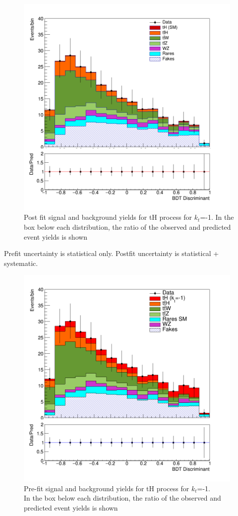 \begin{figure}
	\centering
	\includegraphics[width=11cm,height=11cm]{Chapter4/simple.png}
	\caption{Post fit signal and background yields for tH process for $k_t$=-1.
		In the box below each distribution, the ratio of the observed and predicted event yields is shown}
\end{figure}




Prefit uncertainty is statistical only. Postfit uncertainty is statistical + systematic.


\begin{figure}
	\centering
	\includegraphics[width=11cm,height=11cm]{Chapter4/kin-kt-1.png}
	\caption{Pre-fit signal and background yields for tH process for $k_t$=-1.\\
		In the box below each distribution, the ratio of the observed and predicted event yields is shown}
\end{figure}



